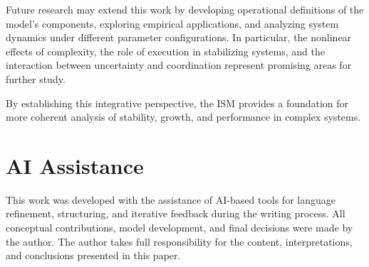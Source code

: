 \documentclass[11pt,a4paper]{article}
\theoremstyle{definition}
\begin{document}
Future research may extend this work by developing operational definitions of the model's components, exploring empirical applications, and analyzing system dynamics under different parameter configurations.
In particular, the nonlinear effects of complexity, the role of execution in stabilizing systems, and the interaction between uncertainty and coordination represent promising areas for further study.

By establishing this integrative perspective, the \ac{ISM} provides a foundation for more coherent analysis of stability, growth, and performance in complex systems.


\section*{AI Assistance}

This work was developed with the assistance of AI-based tools for language refinement, structuring, and iterative feedback during the writing process.
All conceptual contributions, model development, and final decisions were made by the author.
The author takes full responsibility for the content, interpretations, and conclusions presented in this paper.


\printbibliography
\end{document}
